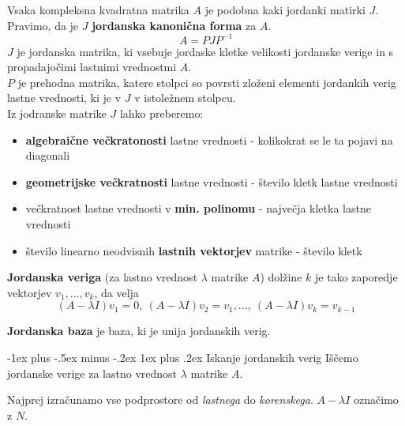 \documentclass[a4paper,landscape]{article}
\makeatletter
\renewcommand{\subsubsection}{\@startsection{subsubsection}{3}{0mm}%
                                {-1ex plus -.5ex minus -.2ex}%
                                {1ex plus .2ex}%
                                {\normalfont\small\bfseries}}
\makeatother
\begin{document}
\begin{multicols}{3}
Vsaka kompleksna kvadratna matrika $A$ je podobna kaki jordanki matirki $J$. Pravimo, da je $J$ \textbf{jordanska kanonična forma} za $A$.
\[A = PJP^{-1}\]
$J$ je jordanska matrika, ki vsebuje jordaske kletke velikosti jordanske verige in s propadajočimi lastnimi vrednostmi $A$. \\
$P$ je prehodna matrika, katere stolpci so povrsti zloženi elementi jordankih verig lastne vrednosti, ki je v $J$ v istoležnem stolpcu.\\

Iz jodranske matrike $J$ lahko preberemo:
\begin{itemize}
    \item \textbf{algebraične večkratonosti} lastne vrednosti - kolikokrat se le ta pojavi na diagonali
    \item \textbf{geometrijske večkratnosti} lastne vrednosti - število kletk lastne vrednosti
    \item večkratnost lastne vrednosti v \textbf{min. polinomu} - največja kletka lastne vrednosti
    \item število linearno neodvisnih \textbf{lastnih vektorjev} matrike - število kletk
\end{itemize}

\textbf{Jordanska veriga} (za lastno vrednost $\lambda$ matrike $A$) dolžine $k$ je tako zaporedje vektorjev $v_1, ..., v_k$, da velja
\[ (A-\lambda I)v_1 = 0,\ (A-\lambda I)v_2 = v_1, ... ,\ (A-\lambda I)v_k = v_{k-1}\]

\textbf{Jordanska baza} je baza, ki je unija jordanskih verig.

\subsubsection{Iskanje jordanskih verig}
Iščemo jordanske verige za lastno vrednost $\lambda$ matrike $A$.

Najprej izračunamo vse podprostore od \emph{lastnega} do \emph{korenskega}. $A-\lambda I$ označimo z $N$.


\end{multicols}
\end{document}
